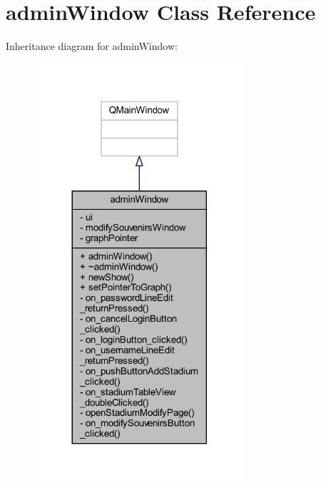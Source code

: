 \hypertarget{classadmin_window}{}\section{admin\+Window Class Reference}
\label{classadmin_window}


Inheritance diagram for admin\+Window\+:
\nopagebreak
\begin{figure}[H]
\begin{center}
\leavevmode
\includegraphics[width=221pt]{classadmin_window__inherit__graph}
\end{center}
\end{figure}


